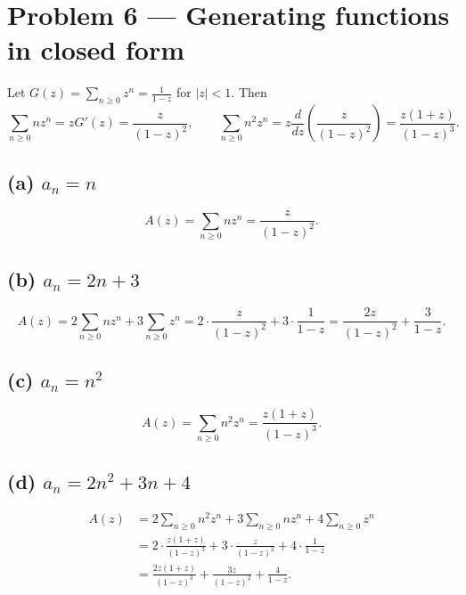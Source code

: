 \section*{Problem 6 — Generating functions in closed form}

Let $G(z)=\sum_{n\ge 0} z^n=\frac{1}{1-z}$ for $|z|<1$.
Then
\[
\sum_{n\ge 0} n z^n = z G'(z)=\frac{z}{(1-z)^2},
\qquad
\sum_{n\ge 0} n^2 z^n = z\frac{d}{dz}\!\left(\frac{z}{(1-z)^2}\right)
= \frac{z(1+z)}{(1-z)^3}.
\]

\subsection*{(a) $a_n=n$}
\[
A(z)=\sum_{n\ge 0} n z^n=\boxed{\dfrac{z}{(1-z)^2}}.
\]

\subsection*{(b) $a_n=2n+3$}
\[
A(z)=2\sum_{n\ge 0} n z^n + 3\sum_{n\ge 0} z^n
= 2\cdot \frac{z}{(1-z)^2} + 3\cdot \frac{1}{1-z}
= \boxed{\frac{2z}{(1-z)^2}+\frac{3}{1-z}}.
\]

\subsection*{(c) $a_n=n^2$}
\[
A(z)=\sum_{n\ge 0} n^2 z^n
=\boxed{\dfrac{z(1+z)}{(1-z)^3}}.
\]

\subsection*{(d) $a_n=2n^2+3n+4$}
\[
\begin{aligned}
A(z)
&= 2\sum_{n\ge 0} n^2 z^n + 3\sum_{n\ge 0} n z^n + 4\sum_{n\ge 0} z^n \\
&= 2\cdot \frac{z(1+z)}{(1-z)^3}
 + 3\cdot \frac{z}{(1-z)^2}
 + 4\cdot \frac{1}{1-z} \\
&=\boxed{\frac{2z(1+z)}{(1-z)^3}+\frac{3z}{(1-z)^2}+\frac{4}{1-z}}.
\end{aligned}
\]